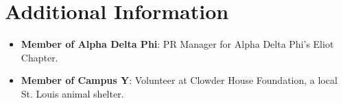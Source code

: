 \documentclass[letterpaper,11pt]{article}
\newcommand{\resumeItemSmall}[2]{
	\item[]
	\small{
		\textbf{#1}{: #2 \vspace{-2pt}}
	}
}
\newcommand{\resumeSubItemSmall}[2]{\resumeItemSmall{#1}{#2}\vspace{-4pt}}
\newcommand{\resumeSubHeadingListStart}{\begin{itemize}[leftmargin=*]}
\newcommand{\resumeSubHeadingListEnd}{\end{itemize}}
\begin{document}
\section{Additional Information}

	\resumeSubHeadingListStart
		\resumeSubItemSmall{Member of Alpha Delta Phi}
		{PR Manager for Alpha Delta Phi's Eliot Chapter.}
		\resumeSubItemSmall{Member of Campus Y}{Volunteer at Clowder House Foundation, a local St. Louis animal shelter.}
	\resumeSubHeadingListEnd
	
\end{document}
